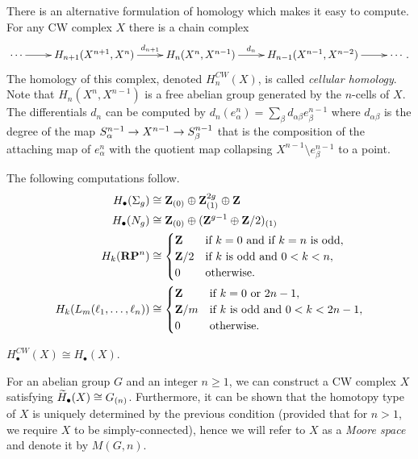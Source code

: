 There is an alternative formulation of homology which makes it easy to compute. For any CW complex $X$ there is a chain complex
\[\xymatrix{
  \cdots \ar[r] & H_{n+1}(X^{n+1}, X^n) \ar[r]^-{d_{n+1}} & H_n(X^n, X^{n-1}) \ar[r]^-{d_n} & H_{n-1}(X^{n-1}, X^{n-2}) \ar[r] & \cdots.
}\]
The homology of this complex, denoted $H^{CW}_n(X)$, is called \emph{cellular homology}. Note that $H_n(X^n, X^{n-1})$ is a free abelian group generated by the $n$-cells of $X$. The differentials $d_n$ can be computed by $d_n(e_\alpha^n) = \sum_\beta d_{\alpha\beta} e_\beta^{n-1}$ where $d_{\alpha\beta}$ is the degree of the map $S_\alpha^{n-1} \rightarrow X^{n-1} \rightarrow S_\beta^{n-1}$ that is the composition of the attaching map of $e_\alpha^n$ with the quotient map collapsing $X^{n-1} \setminus e_\beta^{n-1}$ to a point.

The following computations follow.
\begin{align*}
  H_\bullet(\Sigma_g) &\cong \mathbf{Z}_{(0)} \oplus \mathbf{Z}^{2g}_{(1)} \oplus \mathbf{Z} \\
  H_\bullet(N_g) &\cong \mathbf{Z}_{(0)} \oplus (\mathbf{Z}^{g-1} \oplus \mathbf{Z}/2)_{(1)} \\
  H_k(\mathbf{R}\mathbf{P}^n) &\cong
  \begin{cases}
    \mathbf{Z} & \textnormal{if $k = 0$ and if $k = n$ is odd}, \\
    \mathbf{Z}/2 & \textnormal{if $k$ is odd and $0 < k < n$}, \\
    0 & \textnormal{otherwise}.
  \end{cases} \\
  H_k(L_m(\ell_1, \dots, \ell_n)) &\cong
  \begin{cases}
    \mathbf{Z} & \textnormal{if $k = 0$ or $2n-1$}, \\
    \mathbf{Z}/m & \textnormal{if $k$ is odd and $0 < k < 2n-1$}, \\
    0 & \textnormal{otherwise}.
  \end{cases}
\end{align*}

\begin{theorem}
  $H^{CW}_\bullet(X) \cong H_\bullet(X)$.
\end{theorem}

For an abelian group $G$ and an integer $n \geq 1$, we can construct a CW complex $X$ satisfying $\widetilde{H}_\bullet(X) \cong G_{(n)}$. Furthermore, it can be shown that the homotopy type of $X$ is uniquely determined by the previous condition (provided that for $n > 1$, we require $X$ to be simply-connected), hence we will refer to $X$ as a \emph{Moore space} and denote it by $M(G,n)$.

